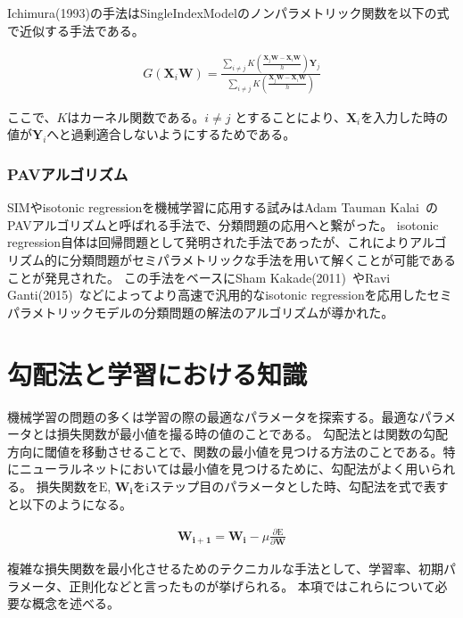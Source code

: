 Ichimura(1993)の手法はSingleIndexModelのノンパラメトリック関数を以下の式で近似する手法である。


\begin{eqnarray}
G(\mathbf{X}_i\mathbf{W})=\frac{\sum_{i\neq j} K\left(\frac{\mathbf{X}_j \mathbf{W} - \mathbf{X}_i \mathbf{W}}{h}\right)\mathbf{Y}_j}{\sum_{i\neq j} K\left(\frac{\mathbf{X}_j \mathbf{W} - \mathbf{X}_i \mathbf{W}}{h}\right)}
\label{eq:ichimura}
\end{eqnarray}

ここで、$ K $はカーネル関数である。$ i \neq j $ とすることにより、$ \mathbf{X}_i $を入力した時の値が$ \mathbf{Y}_i $へと過剰適合しないようにするためである。



\subsubsection{PAVアルゴリズム}

SIMやisotonic regressionを機械学習に応用する試みはAdam Tauman Kalai~\cite{isotron}のPAVアルゴリズムと呼ばれる手法で、分類問題の応用へと繋がった。
isotonic regression自体は回帰問題として発明された手法であったが、これによりアルゴリズム的に分類問題がセミパラメトリックな手法を用いて解くことが可能であることが発見された。
この手法をベースにSham Kakade(2011)~\cite{efficient_sim}やRavi Ganti(2015)~\cite{lsim}などによってより高速で汎用的なisotonic regressionを応用したセミパラメトリックモデルの分類問題の解法のアルゴリズムが導かれた。


\section{勾配法と学習における知識}
機械学習の問題の多くは学習の際の最適なパラメータを探索する。最適なパラメータとは損失関数が最小値を撮る時の値のことである。
勾配法とは関数の勾配方向に閾値を移動させることで、関数の最小値を見つける方法のことである。特にニューラルネットにおいては最小値を見つけるために、勾配法がよく用いられる。
損失関数を$ \mathrm{E} $, $ \mathbf{W_i} $をiステップ目のパラメータとした時、勾配法を式で表すと以下のようになる。

\begin{eqnarray}
\mathbf{W_{i+1}} = \mathbf{W_i} - \mu \frac{\partial \mathrm{E}}{\partial \mathbf{W}}
\label{eq:learning_rate}
\end{eqnarray}

複雑な損失関数を最小化させるためのテクニカルな手法として、学習率、初期パラメータ、正則化などと言ったものが挙げられる。
本項ではこれらについて必要な概念を述べる。
